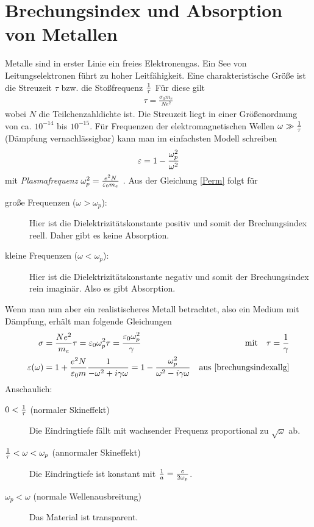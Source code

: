 \section{Brechungsindex und Absorption von Metallen}
Metalle sind in erster Linie ein freies Elektronengas. Ein See von
Leitungselektronen führt zu hoher Leitfähigkeit. Eine
charakteristische Größe ist die 
Streuzeit $\tau$%
%
bzw. 
die Stoßfrequenz $\frac{1}{\tau}$%
%
Für diese gilt
\begin{align*}
  \tau=\frac{\sigma_0m_e}{N e^2}
\end{align*}
wobei 
$N$ die Teilchenzahldichte ist.
Die Streuzeit liegt in einer Größenordnung von
ca. $10^{-14}$ bis $10^{-15}$. Für Frequenzen der elektromagnetischen Wellen
$\omega\gg\frac{1}{\tau}$ (Dämpfung vernachlässigbar) kann man im
einfachsten Modell schreiben
\begin{gather}
  \varepsilon = 1 - \frac{\omega_p^2}{\omega^2} \label{Perm}
\end{gather}
mit \emph{Plasmafrequenz}
$\omega_p^2=\frac{e^2N}{\varepsilon_0 m_e}$%
%
.
Aus der Gleichung \ref{Perm} folgt für
\begin{description}
\item[große Frequenzen ($\omega>\omega_p$):] Hier ist die
  Dielektrizitätskonstante positiv und somit der Brechungsindex
  reell. Daher gibt es keine Absorption. 
\item[kleine Frequenzen ($\omega<\omega_p$):] Hier ist die
  Dielektrizitätskonstante negativ und somit der Brechungsindex
  rein imaginär. Also es gibt Absorption. 
\end{description}
Wenn man nun aber ein realistischeres Metall betrachtet, also ein Medium
mit Dämpfung, erhält man folgende Gleichungen
\begin{align*}
  \sigma
  &= \frac{Ne^2}{m_e}\tau
    = \varepsilon_0\omega_p^2 \tau
    = \frac{\varepsilon_0\omega_p^2}{\gamma}
  &\text{mit}\quad \tau=\frac{1}{\gamma}\\
  \varepsilon(\omega)
  &= 1 + \frac{e^2N}{\varepsilon_0 m}\frac{1}{-\omega^2+i\gamma\omega}
    = 1 - \frac{\omega_p^2}{\omega^2-i\gamma\omega}
  &\text{aus \eqref{brechungsindexallg}}
\end{align*}%
%
Anschaulich:
\begin{description}
\item[$0 < \frac{1}{\tau}$ (normaler Skineffekt)]
  Die Eindringtiefe fällt mit wachsender Frequenz proportional zu
  $\sqrt{\omega}$ ab.
\item[$\frac{1}{\tau}<\omega<\omega_p$ (annormaler Skineffekt)]
  Die Eindringtiefe ist konstant mit $\frac{1}{a}=\frac{c}{2\omega_p}$.
\item[$\omega_p<\omega$ (normale Wellenausbreitung)]
  Das Material ist transparent.
\end{description}



